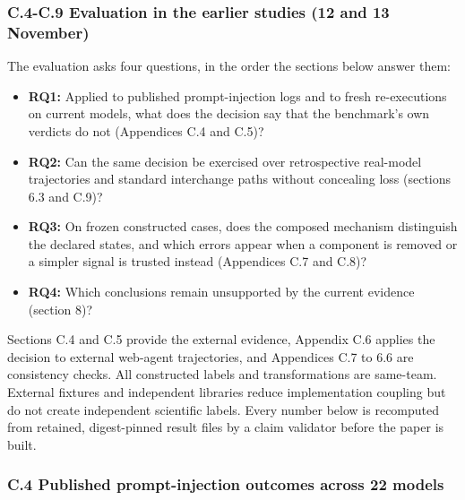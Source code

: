 \documentclass[
  american,
  10pt,
  a4paper,
]{article}
\providecommand{\tightlist}{%
  \setlength{\itemsep}{0pt}\setlength{\parskip}{0pt}}
\begin{document}
\subsubsection{C.4-C.9 Evaluation in the earlier studies (12 and 13
November)}\label{c.4-c.9-evaluation-in-the-earlier-studies-12-and-13-november}

The evaluation asks four questions, in the order the sections below
answer them:

\begin{itemize}
\tightlist
\item
  \textbf{RQ1:} Applied to published prompt-injection logs and to fresh
  re-executions on current models, what does the decision say that the
  benchmark's own verdicts do not (Appendices C.4 and C.5)?
\item
  \textbf{RQ2:} Can the same decision be exercised over retrospective
  real-model trajectories and standard interchange paths without
  concealing loss (sections 6.3 and C.9)?
\item
  \textbf{RQ3:} On frozen constructed cases, does the composed mechanism
  distinguish the declared states, and which errors appear when a
  component is removed or a simpler signal is trusted instead
  (Appendices C.7 and C.8)?
\item
  \textbf{RQ4:} Which conclusions remain unsupported by the current
  evidence (section 8)?
\end{itemize}

Sections C.4 and C.5 provide the external evidence, Appendix C.6 applies
the decision to external web-agent trajectories, and Appendices C.7 to
6.6 are consistency checks. All constructed labels and transformations
are same-team. External fixtures and independent libraries reduce
implementation coupling but do not create independent scientific labels.
Every number below is recomputed from retained, digest-pinned result
files by a claim validator before the paper is built.

\subsubsection{C.4 Published prompt-injection outcomes across 22
models}\label{c.4-published-prompt-injection-outcomes-across-22-models}
\end{document}
